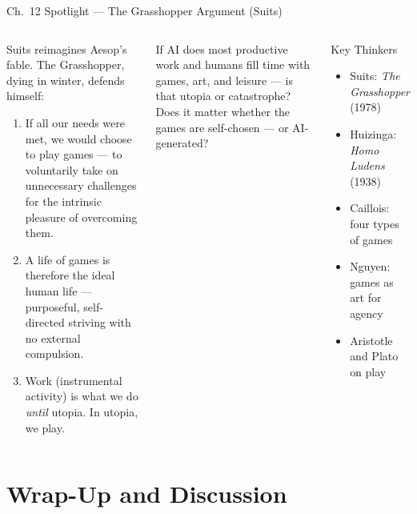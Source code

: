 \documentclass[aspectratio=169,10pt]{beamer}
\begin{document}
\begin{frame}[shrink=5]{Ch.~12 Spotlight --- The Grasshopper Argument (Suits)}
\begin{columns}[c]
\begin{argumentbox}
\footnotesize Suits reimagines Aesop's fable. The Grasshopper, dying in winter, defends himself:
\begin{enumerate}
  \item If all our needs were met, we would choose to play games --- to voluntarily take on unnecessary challenges for the intrinsic pleasure of overcoming them.
  \item A life of games is therefore the ideal human life --- purposeful, self-directed striving with no external compulsion.
  \item Work (instrumental activity) is what we do \emph{until} utopia. In utopia, we play.
\end{enumerate}
\end{argumentbox}
\vspace{0.25em}
\begin{discussionbox}
\footnotesize If AI does most productive work and humans fill time with games, art, and leisure --- is that utopia or catastrophe? Does it matter whether the games are self-chosen --- or AI-generated?
\end{discussionbox}
\begin{block}{Key Thinkers}
\footnotesize
\begin{itemize}
  \item Suits: \emph{The Grasshopper} (1978)
  \item Huizinga: \emph{Homo Ludens} (1938)
  \item Caillois: four types of games
  \item Nguyen: games as art for agency
  \item Aristotle and Plato on play
\end{itemize}
\end{block}
\end{columns}
\end{frame}

\section{Wrap-Up and Discussion}
\end{document}
